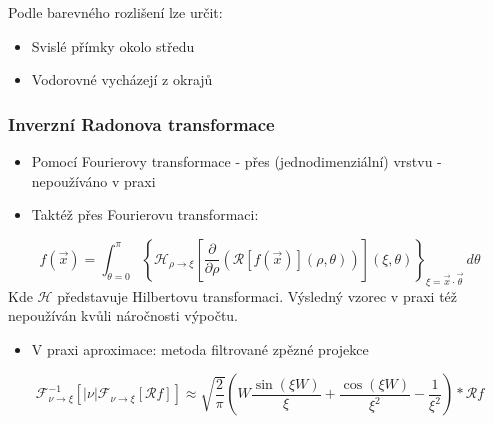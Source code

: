 \documentclass{beamer}
\begin{document}
\begin{frame}
\begin{figure}
\begin{columns}
	 \label{fig:sub4}
\end{columns}
\end{figure}
Podle barevného rozlišení lze určit:
\begin{itemize}
\item Svislé přímky okolo středu
\item Vodorovné vycházejí z okrajů
\end{itemize}
\end{frame}

\begin{frame}
\frametitle{Inverzní Radonova transformace}
\begin{itemize}
\item Pomocí Fourierovy transformace - přes (jednodimenziální) vrstvu - nepoužíváno v praxi
\item Taktéž přes Fourierovu transformaci:
\end{itemize}
\begin{equation*}
f(\vec{x})=  \int_{\theta=0}^{\pi}
	\left\lbrace
		\mathcal{H}_{\rho \to \xi}
			\left[\frac{\partial}{\partial\rho}
				\left(\mathcal{R}[f(\vec{x})](\rho,\theta)
				\right)
			\right]
		(\xi,\theta)
	\right\rbrace
	_{\xi = \vec{x}\cdot\vec{\theta}}
	\,d\theta
\end{equation*}
Kde $\mathcal{H}$ představuje Hilbertovu transformaci. Výsledný vzorec v praxi též nepoužíván kvůli náročnosti výpočtu.
\begin{itemize}
\item V praxi aproximace: metoda filtrované zpězné projekce
\end{itemize}
 \begin{equation*}
   	\mathcal{F}^{-1}_{\nu \to \xi}\left[|{\nu}|\mathcal{F}_{\nu \to \xi}\left[\mathcal{R}f\right]\right]
	\approx
    \sqrt{\frac{2}{\pi}}
    \left(W\frac{\sin\left(\xi W\right)}{\xi}
      +\frac{\cos \left( \xi W \right)}{\xi ^2}-\frac{1}{\xi^2}\right)*\mathcal{R}f	
\end{equation*}
\end{frame}
\end{document}
